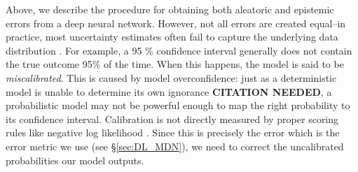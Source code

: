 
\iffalse
Above, we describe the procedure for obtaining both aleatoric and epistemic errors from a deep neural network. However, not all errors are created equal--in practice, most uncertainty estimates often fail to capture the underlying data distribution \citep{lakshminarayanan_probability_calibration0, probability_calibration1, crude_probability_calibration}. For example, a 95 \% confidence interval generally does not contain the true outcome 95\% of the time. When this happens, the model is said to be \emph{miscalibrated}. This is caused by model overconfidence: just as a deterministic model is unable to determine its own ignorance \textbf{CITATION NEEDED}, a probabilistic model may not be powerful enough to map the right probability to its confidence interval. Calibration is not directly measured by proper scoring rules like negative log likelihood \citep{measuring_calibration_in_deep_learning}. Since this is precisely the error which is the error metric we use (see \S\ref{sec:DL_MDN}), we need to correct the uncalibrated probabilities our model outputs.

